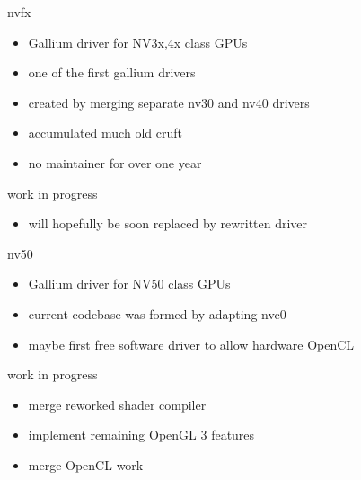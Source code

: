 \documentclass[11pt,english,compress]{beamer}
\begin{document}
		\begin{frame}
			\begin{block}{nvfx}
				\begin{itemize}
					\item Gallium driver for NV3x,4x class GPUs
					\item one of the first gallium drivers
					\item created by merging separate nv30 and nv40 drivers
					\item accumulated much old cruft
					\item no maintainer for over one year
				\end{itemize}
			\end{block}
			\begin{block}{work in progress}
				\begin{itemize}
					\item will hopefully be soon replaced by rewritten driver
				\end{itemize}
			\end{block}
		\end{frame}
		\begin{frame}
			\begin{block}{nv50}
				\begin{itemize}
					\item Gallium driver for NV50 class GPUs
					\item current codebase was formed by adapting nvc0
					\item maybe first free software driver to allow hardware OpenCL
				\end{itemize}
			\end{block}
			\begin{block}{work in progress}
				\begin{itemize}
					\item merge reworked shader compiler
					\item implement remaining OpenGL 3 features
					\item merge OpenCL work
				\end{itemize}
			\end{block}
		\end{frame}
\end{document}
